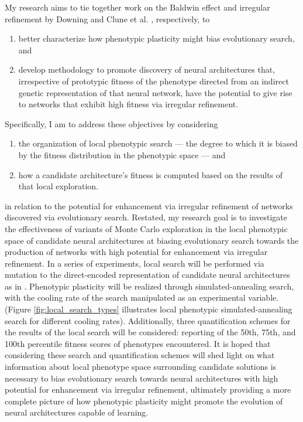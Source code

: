 My research aims to tie together work on the Baldwin effect and irregular refinement by Downing \autocite{Downing2009ComputationalEffect,Downing2010TheNetworks,DowningHeterochronousBaldwinism} and Clune et al. \autocite{Clune2011OnRegularity}, respectively, to
\begin{enumerate}
  \item better characterize how phenotypic plasticity might bias evolutionary search, and
  \item develop methodology to promote discovery of neural architectures that, irrespective of prototypic fitness of the phenotype directed from an indirect genetic representation of that neural network, have the potential to give rise to networks that exhibit high fitness via irregular refinement.
\end{enumerate}
Specifically, I am to address these objectives by considering
\begin{enumerate}
  \item the organization of local phenotypic search --- the degree to which it is biased by the fitness distribution in the phenotypic space --- and
  \item how a candidate architecture's fitness is computed based on the results of that local exploration.
\end{enumerate}
in relation to the potential for enhancement via irregular refinement of networks discovered via evolutionary search. Restated, my research goal is to investigate the effectiveness of variants of Monte Carlo exploration in the local phenotypic space of candidate neural architectures at biasing evolutionary search towards the production of networks with high potential for enhancement via irregular refinement. In a series of experiments, local search will be performed via mutation to the direct-encoded representation of candidate neural architectures as in \autocite{Clune2011OnRegularity}. Phenotypic plasticity will be realized through simulated-annealing search, with the cooling rate of the search manipulated as an experimental variable. (Figure \ref{fig:local_search_types} illustrates local phenotypic simulated-annealing search for different cooling rates). Additionally, three quantification schemes for the results of the local search will be considered: reporting of the 50th, 75th, and 100th percentile fitness scores of phenotypes encountered. It is hoped that considering these search and quantification schemes will shed light on what information about local phenotype space surrounding candidate solutions is necessary to bias evolutionary search towards neural architectures with high potential for enhancement via irregular refinement, ultimately providing a more complete picture of how phenotypic plasticity might promote the evolution of neural architectures capable of learning.

